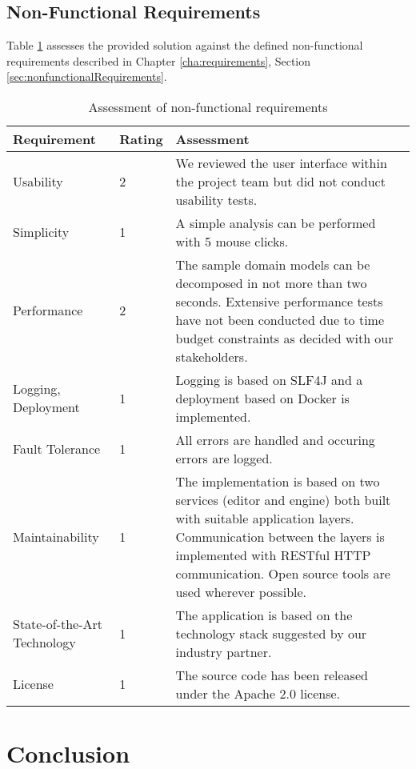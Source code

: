 \clearpage
\subsection{Non-Functional Requirements}

Table \ref{tab:conclusionNonFunctional} assesses the provided solution against the defined non-functional requirements described in Chapter \ref{cha:requirements}, Section \ref{sec:nonfunctionalRequirements}. %

\begin{table}[H]
	\centering
	\caption{Assessment of non-functional requirements}
	\label{tab:conclusionNonFunctional}
	\begin{tabular}{|p{100pt}|l|p{250pt}|}
	\hline \textbf{Requirement} & \textbf{Rating} & \textbf{Assessment} \\ 
	\hline Usability & 2 & We reviewed the user interface within the project team but did not conduct usability tests. \\
	\hline Simplicity & 1 & A simple analysis can be performed with 5 mouse clicks. \\
	\hline Performance & 2 & The sample domain models can be decomposed in not more than two seconds. Extensive performance tests have not been conducted due to time budget constraints as decided with our stakeholders. \\
	\hline Logging, \newline Deployment & 1 & Logging is based on SLF4J and a deployment based on Docker is implemented. \\
	\hline Fault Tolerance & 1 & All errors are handled and occuring errors are logged. \\
	\hline Maintainability & 1 & The implementation is based on two services (editor and engine) both built with suitable application layers. Communication between the layers is implemented with RESTful HTTP communication. Open source tools are used wherever possible. \\
	\hline State-of-the-Art Technology & 1 & The application is based on the technology stack suggested by our industry partner. \\
	\hline License & 1 & The source code has been released under the Apache 2.0 license. \\
	\hline 
	\end{tabular} 
\end{table}


\section{Conclusion}

